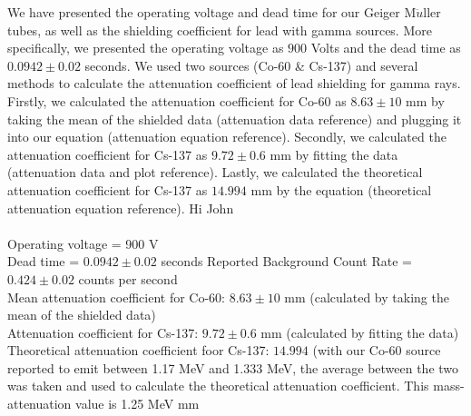 We have presented the operating voltage and dead time for our Geiger M$\ddot{u}$ller tubes, as well as the shielding coefficient for lead with gamma sources. More specifically, we presented the operating voltage as $900$ Volts and the dead time as $0.0942 \pm 0.02$ seconds. We used two sources (Co-60 \& Cs-137) and several methods to calculate the attenuation coefficient of lead shielding for gamma rays. Firstly, we calculated the attenuation coefficient for Co-60 as $8.63 \pm 10$ mm by taking the mean of the shielded data (attenuation data reference) and plugging it into our equation (attenuation equation reference). Secondly, we calculated the attenuation coefficient for Cs-137 as $9.72 \pm 0.6$ mm by fitting the data (attenuation data and plot reference). Lastly, we calculated the theoretical attenuation coefficient for Cs-137 as $14.994$ mm by the equation (theoretical attenuation equation reference). Hi John
\\ \\
Operating voltage = 900 V \\
Dead time = $0.0942 \pm 0.02$ seconds
Reported Background Count Rate  = $0.424 \pm 0.02$ counts per second \\ 
Mean attenuation coefficient for Co-60: $8.63 \pm 10$ mm (calculated by taking the mean of the shielded data) \\
Attenuation coefficient for Cs-137: $9.72 \pm 0.6$ mm (calculated by fitting the data) \\
Theoretical attenuation coefficient foor Cs-137: $14.994$ (with our Co-60 source reported to emit between 1.17 MeV and 1.333 MeV, the average between the two was taken and used to calculate the theoretical attenuation coefficient. This mass-attenuation value is 1.25 MeV mm